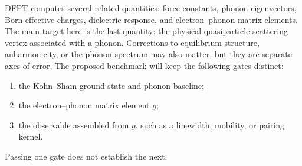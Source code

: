 DFPT computes several related quantities: force constants, phonon eigenvectors,
Born effective charges, dielectric response, and electron--phonon matrix elements.
The main target here is the last quantity: the physical quasiparticle scattering
vertex associated with a phonon.  Corrections to equilibrium structure,
anharmonicity, or the phonon spectrum may also matter, but they are separate axes
of error.  The proposed benchmark will keep the following gates distinct:

\begin{enumerate}
  \item the Kohn--Sham ground-state and phonon baseline;
  \item the electron--phonon matrix element $g$;
  \item the observable assembled from $g$, such as a linewidth, mobility, or
  pairing kernel.
\end{enumerate}

Passing one gate does not establish the next.
